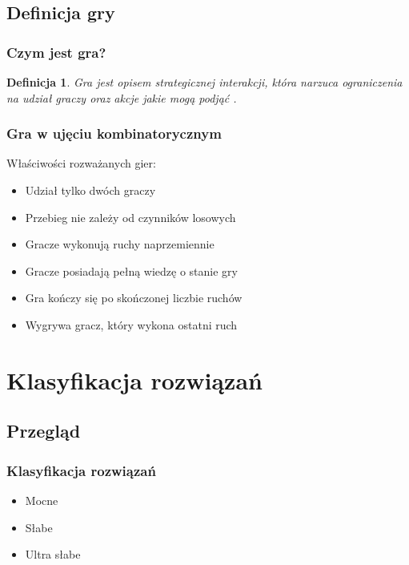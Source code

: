 \documentclass[polish,envcountsect,10pt]{beamer}
\newtheorem{mdfn}{Definicja}
\begin{document}
        \subsection{Definicja gry}
            \begin{frame}
                \frametitle{Czym jest gra?}
                    \begin{mdfn}
                        Gra jest opisem strategicznej interakcji, która narzuca ograniczenia na udział graczy oraz akcje jakie mogą podjąć \cite{course_gt}.
                    \end{mdfn}
            \end{frame}
            \begin{frame}
                \frametitle{Gra w ujęciu kombinatorycznym}
                Właściwości rozważanych gier:
                \begin{itemize}
                    \item<2-> Udział tylko dwóch graczy
                    \item<3-> Przebieg nie zależy od czynników losowych
                    \item<4-> Gracze wykonują ruchy naprzemiennie
                    \item<5-> Gracze posiadają pełną wiedzę o stanie gry
                    \item<6-> Gra kończy się po skończonej liczbie ruchów
                    \item<7-> Wygrywa gracz, który wykona ostatni ruch
                \end{itemize}
            \end{frame}
    \section{Klasyfikacja rozwiązań}
        \subsection{Przegląd}
            \begin{frame}
                \frametitle{Klasyfikacja rozwiązań}
                \begin{itemize}
                    \item<1-> Mocne
                    \item<2-> Słabe
                    \item<3-> Ultra słabe
                \end{itemize}
            \end{frame}
\end{document}
